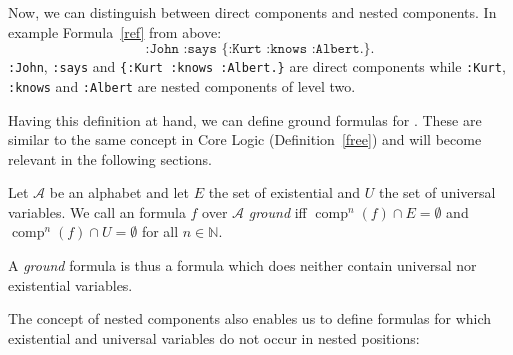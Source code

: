 Now, we can distinguish between direct components and 
nested components. In example Formula~\ref{ref} from above:
\[
  \texttt{:John :says \{:Kurt :knows :Albert.\}.}
\]
 \verb!:John!, \verb!:says! and \verb!{:Kurt :knows :Albert.}! are direct components while \verb!:Kurt!,  \verb!:knows! and  \verb!:Albert! are nested components of
level two. %

Having this definition at hand, we can define ground formulas for \nthree. These are similar to the same concept in \nthree 
Core Logic (Definition~\ref{free}) and will become relevant in the following sections.

\begin{definition}
Let $\mathcal{A}$ be an \nthree alphabet and let $E$ the set of existential and $U$ the set of universal variables.
We call an \nthree formula $f$ over $\mathcal{A}$ \emph{ground} 
iff $\operatorname{comp}^n(f)\cap E=\emptyset$ and $\operatorname{comp}^n(f)\cap U=\emptyset$ for all $n\in\mathbb{N}$.
\end{definition}

A \emph{ground} formula is thus a formula which does neither contain universal nor existential variables. 

The concept of nested components also enables us to define formulas for which existential and universal variables do not occur in nested positions:

